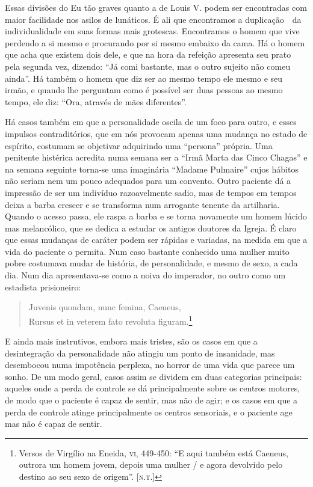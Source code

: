 Essas divisões do Eu tão graves quanto a de Louis V. podem ser
encontradas com maior facilidade nos asilos de lunáticos. É ali que
encontramos a duplicação\ \ da individualidade em suas formas mais
grotescas.  Encontramos o homem que vive perdendo a si mesmo e
procurando por si mesmo embaixo da cama.  Há o homem que acha que
existem dois dele, e que na hora da refeição apresenta seu prato pela
segunda vez, dizendo: “Já comi bastante, mas o outro sujeito não comeu
ainda”.  Há também o homem que diz ser ao mesmo tempo ele mesmo e seu
irmão, e quando lhe perguntam como é possível ser duas pessoas ao mesmo
tempo, ele diz: “Ora, através de mães diferentes”.

Há casos também em que a personalidade oscila de um foco para outro, e
esses impulsos contraditórios, que em nós provocam apenas uma mudança
no estado de espírito, costumam se objetivar adquirindo uma “persona”
própria.  Uma penitente histérica acredita numa semana ser a “Irmã
Marta das Cinco Chagas” e na semana seguinte torna-se uma imaginária
“Madame Pulmaire” cujos hábitos não seriam nem um pouco adequados para
um convento.  Outro paciente dá a impressão de ser um indivíduo
razoavelmente sadio, mas de tempos em tempos deixa a barba crescer e se
transforma num arrogante tenente da artilharia. Quando o acesso passa,
ele raspa a barba e se torna novamente um homem lúcido mas melancólico,
que se dedica a estudar os antigos doutores da Igreja. É claro que
essas mudanças de caráter podem ser rápidas e variadas, na medida em
que a vida do paciente o permita.  Num caso bastante conhecido uma
mulher muito pobre costumava mudar de história, de personalidade, e
mesmo de sexo, a cada dia.  Num dia apresentava-se como a noiva do
imperador, no outro como um estadista prisioneiro:

\begin{quote}
Juvenis quondam, nunc femina, Caeneus,\\
Rursus et in veterem fato revoluta figuram.\footnote{
Versos de Virgílio na Eneida, \textsc{vi}, 449-450: “E aqui também
está Caeneus, outrora um homem jovem, depois uma mulher / e agora
devolvido pelo destino ao seu sexo de origem”. [\textsc{n.t.}]}
\end{quote}

E ainda mais instrutivos, embora mais tristes, são os casos em que a
desintegração da personalidade não atingiu um ponto de insanidade, mas
desembocou numa impotência perplexa, no horror de uma vida que parece
um sonho.  De um modo geral, casos assim se dividem em duas categorias
principais: aqueles onde a perda de controle se dá principalmente sobre
os centros motores, de modo que o paciente é capaz de sentir, mas não
de agir; e os casos em que a perda de controle atinge principalmente os
centros sensoriais, e o paciente age mas não é capaz de sentir.

